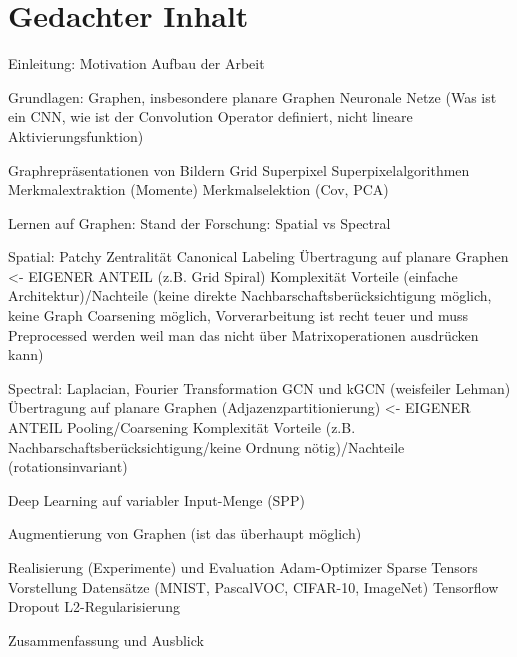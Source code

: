 \chapter{Gedachter Inhalt}

Einleitung:
Motivation
Aufbau der Arbeit

Grundlagen:
Graphen, insbesondere planare Graphen
Neuronale Netze (Was ist ein CNN, wie ist der Convolution Operator definiert, nicht lineare Aktivierungsfunktion)

Graphrepräsentationen von Bildern
Grid
Superpixel
Superpixelalgorithmen
Merkmalextraktion (Momente)
Merkmalselektion (Cov, PCA)

Lernen auf Graphen:
Stand der Forschung: Spatial vs Spectral

Spatial:
Patchy
Zentralität
Canonical Labeling
Übertragung auf planare Graphen <- EIGENER ANTEIL (z.B. Grid Spiral)
Komplexität
Vorteile (einfache Architektur)/Nachteile (keine direkte Nachbarschaftsberücksichtigung möglich, keine Graph Coarsening möglich, Vorverarbeitung ist recht teuer und muss Preprocessed werden weil man das nicht über Matrixoperationen ausdrücken kann)

Spectral:
Laplacian, Fourier Transformation
GCN und kGCN (weisfeiler Lehman)
Übertragung auf planare Graphen (Adjazenzpartitionierung) <- EIGENER ANTEIL
Pooling/Coarsening
Komplexität
Vorteile (z.B. Nachbarschaftsberücksichtigung/keine Ordnung nötig)/Nachteile (rotationsinvariant)

Deep Learning auf variabler Input-Menge (SPP)

Augmentierung von Graphen (ist das überhaupt möglich)

Realisierung (Experimente) und Evaluation
Adam-Optimizer
Sparse Tensors
Vorstellung Datensätze (MNIST, PascalVOC, CIFAR-10, ImageNet)
Tensorflow
Dropout L2-Regularisierung

Zusammenfassung und Ausblick
